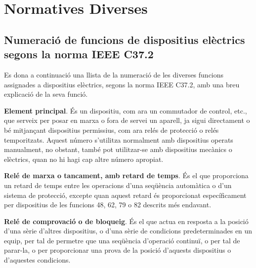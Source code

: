 \chapter{Normatives Diverses}\label{sec:normes}

\section{Numeració de funcions de dispositius elèctrics segons la norma IEEE C37.2 }\label{sec:ieee-c37-2}

Es dona a continuació una llista de la numeració de les diverses funcions assignades a dispositius
elèctrics, segons la norma IEEE C37.2, amb una breu
explicació de la seva funció.

\begin{multicols}{2}
\begin{list}{}
{\setlength{\labelwidth}{6mm} \setlength{\leftmargin}{6mm}
\setlength{\labelsep}{2mm}}

\item[\textbf{1}]  
\textbf{Element principal}. És un dispositiu, com ara un commutador de control, etc., que serveix per posar en marxa o fora de servei un aparell, ja sigui directament o bé  mitjançant
dispositius permissius, com ara relés de protecció o relés temporitzats. Aquest número s'utilitza normalment amb dispositius operats manualment, no obstant, també pot utilitzar-se amb dispositius mecànics o elèctrics, quan no hi hagi cap altre número apropiat.

\item[\textbf{2}]    
  
\textbf{Relé
de marxa o tancament, amb retard de temps}. És el que
proporciona un retard de temps entre les operacions d'una seqüència
automàtica o d'un sistema de protecció, excepte quan aquest retard
és proporcionat específicament per dispositius de les funcions 48, 62, 79 o 82
descrits més endavant.

\item[\textbf{3}]  
 \textbf{Relé de comprovació o
de bloqueig}. És el que actua en resposta a la posició d'una sèrie
d'altres dispositius, o d'una sèrie de condicions predeterminades
en un equip, per tal de permetre que una seqüència d'operació
continuï, o per tal de parar-la, o per proporcionar una prova de la
posició d'aquests dispositius o d'aquestes condicions.


\end{list}
\end{multicols}
